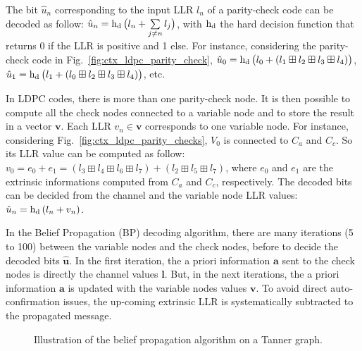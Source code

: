 The bit $\hat{u}_n$ corresponding to the input LLR $l_n$ of a parity-check code
can be decoded as follow: $\hat{u}_n = \operatorname{h_d}\big(l_n +
\sum\limits_{j \neq n}{l_j}\big)$, with $\operatorname{h_d}$ the hard decision function
that returns 0 if the LLR is positive and 1 else. For instance, considering the
parity-check code in Fig.~\ref{fig:ctx_ldpc_parity_check}, $\hat{u}_0 =
\operatorname{h_d}\big(l_0 + (l_1 \boxplus l_2 \boxplus l_3 \boxplus l_4)\big)$,
$\hat{u}_1 = \operatorname{h_d}\big(l_1 + (l_0 \boxplus l_2 \boxplus l_3 \boxplus
l_4)\big)$, etc.

In LDPC codes, there is more than one parity-check node. It is then possible to
compute all the check nodes connected to a variable node and to store the result
in a vector $\bm{v}$. Each LLR $v_n \in \bm{v}$ corresponds to one variable
node. For instance, considering Fig.~\ref{fig:ctx_ldpc_parity_checks}, $V_0$ is
connected to $C_a$ and $C_c$. So its LLR value can be computed as follow: $v_0
= e_0 + e_1 = (l_3 \boxplus l_4 \boxplus l_6 \boxplus l_7) + (l_2 \boxplus l_5
\boxplus l_7)$, where $e_0$ and $e_1$ are the extrinsic informations computed
from $C_a$ and $C_c$, respectively. The decoded bits can be decided from the
channel and the variable node LLR values: $\hat{u}_n = \operatorname{h_d}{(l_n + v_n)}$.

In the Belief Propagation (BP) decoding algorithm, there are many iterations (5
to 100) between the variable nodes and the check nodes, before to decide the
decoded bits $\bm{\hat{u}}$. In the first iteration, the a priori information
$\bm{a}$ sent to the check nodes is directly the channel values $\bm{l}$. But,
in the next iterations, the a priori information $\bm{a}$ is updated with the
variable nodes values $\bm{v}$. To avoid direct auto-confirmation issues, the
up-coming extrinsic LLR is systematically subtracted to the propagated message.

\begin{figure}[htp]
  \centering
  \quad
  \caption{Illustration of the belief propagation algorithm on a Tanner graph.}
  \label{fig:ctx_ldpc_bp}
\end{figure}

